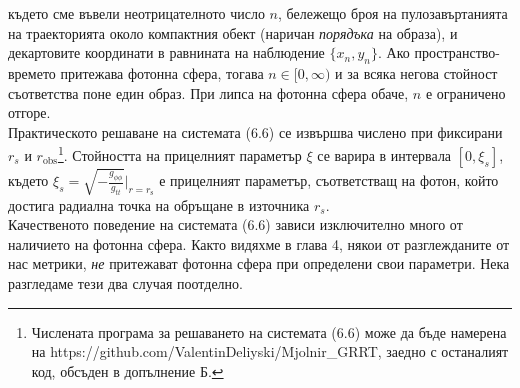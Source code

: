 където сме въвели неотрицателното число $n$, бележещо броя на пулозавъртанията на траекторията около компактния обект (наричан \emph{порядъка} на образа), и декартовите координати в равнината на наблюдение $\{x_n,y_n\}$. Ако пространство-времето притежава фотонна сфера, тогава $n \in [0,\infty)$ и за всяка негова стойност съответства поне един образ. При липса на фотонна сфера обаче, $n$ е ограничено отгоре.\\ 

Практическото решаване на системата (6.6) се извършва числено при фиксирани $r_s$ и $r_\text{obs}$\footnote{ Числената програма за решаването на системата (6.6) може да бъде намерена на https://github.com/ValentinDeliyski/Mjolnir\_GRRT, заедно с останалият код, обсъден в допълнение Б.}. Стойността на прицелният параметър $\xi$ се варира в интервала $\left[0, \xi_s\right]$, където $\xi_s = \sqrt{-\frac{g_{\phi\phi}}{g_{tt}}}\big\vert_{r = r_\text{s}}$ е прицелният параметър, съответстващ на фотон, който достига радиална точка на обръщане в източника $r_s$.\\

Качественото поведение на системата (6.6) зависи изключително много от наличието на фотонна сфера. Както видяхме в глава 4, някои от разглежданите от нас метрики, \emph{не} притежават фотонна сфера при определени свои параметри. Нека разгледаме тези два случая поотделно.

